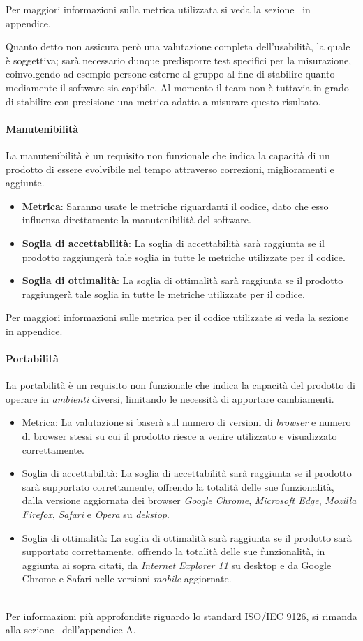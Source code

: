 Per maggiori informazioni sulla metrica utilizzata si veda la sezione~ in appendice.

Quanto detto non assicura però una valutazione completa dell'usabilità, la quale è soggettiva; sarà necessario dunque predisporre test specifici per la misurazione, coinvolgendo ad esempio persone esterne al gruppo al fine di stabilire quanto mediamente il software sia capibile. Al momento il team non è tuttavia in grado di stabilire con precisione una metrica adatta a misurare questo risultato.

\paragraph{Manutenibilità}
La manutenibilità è un requisito non funzionale che indica la capacità di un prodotto di essere evolvibile nel tempo attraverso correzioni, miglioramenti e aggiunte.

\begin{itemize}
\item \textbf{Metrica}: Saranno usate le metriche riguardanti il codice, dato che esso influenza direttamente la manutenibilità del software.
\item \textbf{Soglia di accettabilità}: La soglia di accettabilità sarà raggiunta se il prodotto raggiungerà tale soglia in tutte le metriche utilizzate per il codice.
\item \textbf{Soglia di ottimalità}: La soglia di ottimalità sarà raggiunta se il prodotto raggiungerà tale soglia in tutte le metriche utilizzate per il codice.
\end{itemize}

Per maggiori informazioni sulle metrica per il codice utilizzate si veda la sezione~ in appendice.

\paragraph{Portabilità}
La portabilità è un requisito non funzionale che indica la capacità del prodotto di operare in \textit{ambienti} diversi, limitando le necessità di apportare cambiamenti.
\begin{itemize}
	\item Metrica: La valutazione si baserà sul numero di versioni di \emph{browser} e numero di browser stessi su cui il prodotto riesce a venire utilizzato e visualizzato correttamente.
	\item Soglia di accettabilità: La soglia di accettabilità sarà raggiunta se il prodotto sarà supportato correttamente, offrendo la totalità delle sue funzionalità, dalla versione aggiornata dei browser \emph{Google Chrome}, \emph{Microsoft Edge}, \emph{Mozilla Firefox}, \emph{Safari} e \emph{Opera} su \emph{dekstop}.
	\item Soglia di ottimalità: La soglia di ottimalità sarà raggiunta se il prodotto sarà supportato correttamente, offrendo la totalità delle sue funzionalità, in aggiunta ai sopra citati, da \emph{Internet Explorer 11} su desktop e da Google Chrome e Safari nelle versioni \emph{mobile} aggiornate.
\end{itemize}

~\\
Per informazioni più approfondite riguardo lo standard ISO/IEC 9126, si rimanda alla sezione~ dell'appendice A.




